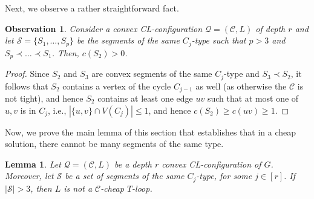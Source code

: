 \documentclass{article}
\newtheorem{lemma}[theorem]{Lemma}
\newtheorem{observation}[theorem]{Observation}
\numberwithin{claimcounter}{lemma}
\begin{document}
Next, we observe a rather straightforward fact.
\begin{observation}\label{O:free}
    Consider a convex CL-configuration $\mathcal{Q} = (\mathcal{C},L)$ of depth $r$ and let $\mathcal{S} = \{S_1,\ldots,S_p\}$ be the segments of the same $C_j$-type such that $p>3$ and $S_p \prec \ldots \prec S_1$. Then, $c(S_2) >0$. 
\end{observation}
\begin{proof}
    Since $S_2$ and $S_3$ are convex segments of the same $C_j$-type and $S_3\prec S_2$, it follows that $S_2$ contains a vertex of the cycle $C_{j-1}$ as well (as otherwise the $\mathcal{C}$ is not tight), and hence $S_2$ contains at least one edge $uv$ such that at most one of $u,v$ is in $C_j$, i.e., $|\{u,v\} \cap V(C_j)| \leq 1$, and hence $c(S_2) \geq c(uv) \geq 1$.
\end{proof}


Now, we prove the main lemma of this section that establishes that in a cheap solution, there cannot be many segments of the same type. 
\begin{lemma}\label{L:main}
   Let $\mathcal{Q}=(\mathcal{C},L)$ be a depth $r$ convex CL-configuration of $G$. Moreover, let $\mathcal{S}$ be a set of segments of the same $C_j$-type, for some $j\in [r]$. If $|\mathcal{S}|>3$, then $L$ is not a $\mathcal{C}$-cheap $T$-loop. 
\end{lemma}
\end{document}
